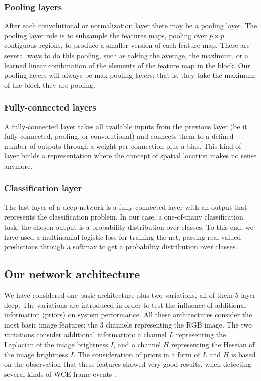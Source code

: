 \documentclass[review,12pt,3p]{elsarticle}
\begin{document}
\subsubsection{Pooling layers}
After each convolutional or normalization layer there may be a pooling layer. The pooling layer role is to subsample the features maps, pooling over $p \times p$ contiguous regions, to produce a smaller version of each feature map. There are several ways to do this pooling, such as taking the average, the maximum, or a learned linear combination of the elements of the feature map in the block. Our pooling layers will always be max-pooling layers; that is, they take the maximum of the block they are pooling.

\subsubsection{Fully-connected layers}
A fully-connected layer takes all available inputs from the previous layer (be it fully connected, pooling, or convolutional) and connects them to a defined number of outputs through a weight per connection plus a bias. This kind of layer builds a representation where the concept of spatial location makes no sense anymore.

\subsubsection{Classification layer}
The last layer of a deep network is a fully-connected layer with an output that represents the classification problem. In our case, a one-of-many classification task, the chosen output is a probability distribution over classes. To this end, we have used a multinomial logistic loss for training the net, passing real-valued predictions through a softmax to get a probability distribution over classes.


\subsection{Our network architecture}
\label{subsec1}

We have considered one basic architecture plus two variations, all of them 5-layer deep. The variations are introduced in order to test the influence of additional information (priors) on system performance. All these architectures consider the most basic image  features: the 3 channels representing the RGB image. The two variations consider additional information: a channel $L$ representing the Laplacian of the image brightness $I$, and a channel $H$ representing the Hessian of the image brightness $I$. The consideration of priors in a form of $L$ and $H$ is based on the observation that these features showed very good results, when detecting several kinds of WCE frame events \cite{sseguiWrinkles, sseguiTurbid}. 
\end{document}
